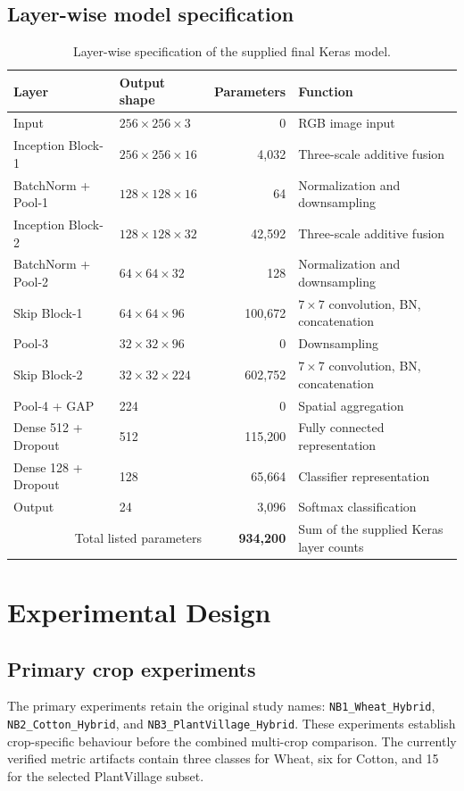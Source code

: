 \documentclass[a4paper,fleqn]{cas-dc}
\begin{document}
\subsection{Layer-wise model specification}
\begin{table}[t]
\centering
\caption{Layer-wise specification of the supplied final Keras model.}
\label{tab:model}
\small
\begin{tabularx}{\textwidth}{@{}l l r X@{}}
\toprule
Layer & Output shape & Parameters & Function \\
\midrule
Input & $256\times256\times3$ & 0 & RGB image input \\
Inception Block-1 & $256\times256\times16$ & 4,032 & Three-scale additive fusion \\
BatchNorm + Pool-1 & $128\times128\times16$ & 64 & Normalization and downsampling \\
Inception Block-2 & $128\times128\times32$ & 42,592 & Three-scale additive fusion \\
BatchNorm + Pool-2 & $64\times64\times32$ & 128 & Normalization and downsampling \\
Skip Block-1 & $64\times64\times96$ & 100,672 & $7\times7$ convolution, BN, concatenation \\
Pool-3 & $32\times32\times96$ & 0 & Downsampling \\
Skip Block-2 & $32\times32\times224$ & 602,752 & $7\times7$ convolution, BN, concatenation \\
Pool-4 + GAP & 224 & 0 & Spatial aggregation \\
Dense 512 + Dropout & 512 & 115,200 & Fully connected representation \\
Dense 128 + Dropout & 128 & 65,664 & Classifier representation \\
Output & 24 & 3,096 & Softmax classification \\
\midrule
\multicolumn{2}{r}{Total listed parameters} & \textbf{934,200} & Sum of the supplied Keras layer counts \\
\bottomrule
\end{tabularx}
\end{table}

\section{Experimental Design}
\subsection{Primary crop experiments}
The primary experiments retain the original study names: \texttt{NB1\_Wheat\_Hybrid}, \texttt{NB2\_Cotton\_Hybrid}, and \texttt{NB3\_PlantVillage\_Hybrid}. These experiments establish crop-specific behaviour before the combined multi-crop comparison. The currently verified metric artifacts contain three classes for Wheat, six for Cotton, and 15 for the selected PlantVillage subset.
\end{document}
